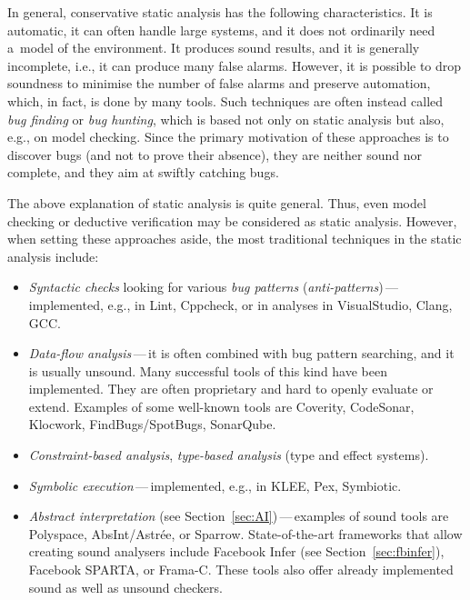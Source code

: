 In general, conservative static analysis has the following characteristics. It is automatic, it can often handle large systems, and it does not ordinarily need a~model of the environment. It produces sound results, and it is generally incomplete, i.e., it can produce many false alarms. However, it is possible to drop soundness to minimise the number of false alarms and preserve automation, which, in fact, is done by many tools. Such techniques are often instead called \emph{bug finding} or \emph{bug hunting}, which is based not only on static analysis but also, e.g., on model checking. Since the primary motivation of these approaches is to discover bugs (and not to prove their absence), they are neither sound nor complete, and they aim at swiftly catching bugs.

The above explanation of static analysis is quite general. Thus, even model checking or deductive verification may be considered as static analysis. However, when setting these approaches aside, the most traditional techniques in the static analysis include:
\begin{itemize}
    \item \emph{Syntactic checks} looking for various \emph{bug patterns} (\emph{anti-patterns})\,---\,implemented, e.g., in Lint, Cppcheck, or in analyses in VisualStudio, Clang, GCC.

    \item \emph{Data-flow analysis}\,---\,it is often combined with bug pattern searching, and it is usually unsound. Many successful tools of this kind have been implemented. They are often proprietary and hard to openly evaluate or extend. Examples of some well-known tools are Coverity, CodeSonar, Klocwork, FindBugs/SpotBugs, SonarQube.

    \item \emph{Constraint-based analysis}, \emph{type-based analysis} (type and effect systems).

    \item \emph{Symbolic execution}\,---\,implemented, e.g., in KLEE, Pex, Symbiotic.
    
    \item \emph{Abstract interpretation} (see Section~\ref{sec:AI})\,---\,examples of sound tools are Polyspace, AbsInt/Astrée, or Sparrow. State-of-the-art frameworks that allow creating sound analysers include Facebook Infer (see Section~\ref{sec:fbinfer}), Facebook SPARTA, or Frama-C. These tools also offer already implemented sound as well as unsound checkers.
\end{itemize}

